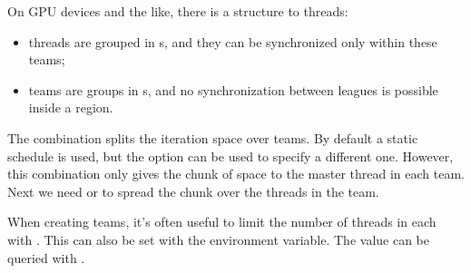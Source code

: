 On GPU devices and the like, there is a structure to threads:
\begin{itemize}
\item threads are grouped in s,
  and they can be synchronized only within these teams;
\item teams are groups in s,
  and no synchronization between leagues is possible
  inside a  region.
\end{itemize}

The combination  splits the iteration space over teams.
By default a static schedule is used,
but the option  can be used to specify a different one.
However, this combination only gives the chunk of space to the master thread
in each team.
Next we need  or  to spread the chunk over the
threads in the team.

When creating teams, it's often useful to limit the number of threads in each
with .
This can also be set with the 
environment variable.
The value can be queried with .


